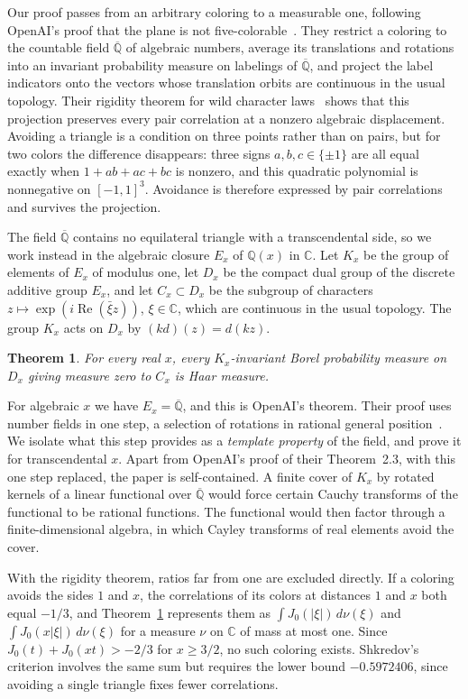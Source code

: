 \documentclass[10pt]{article}
\newtheorem{thm}{Theorem}[section]
\theoremstyle{remark}
\newcommand{\C}{\mathbb C}
\newcommand{\Q}{\mathbb Q}
\newcommand{\Qbar}{\overline{\mathbb Q}}
\DeclareMathOperator{\re}{Re}
\begin{document}
Our proof passes from an arbitrary coloring to a measurable one, following OpenAI's proof that the plane is not five-colorable~\cite{OAI}. They restrict a coloring to the countable field $\Qbar$ of algebraic numbers, average its translations and rotations into an invariant probability measure on labelings of $\Qbar$, and project the label indicators onto the vectors whose translation orbits are continuous in the usual topology. Their rigidity theorem for wild character laws~\cite[Theorem~2.3]{OAI} shows that this projection preserves every pair correlation at a nonzero algebraic displacement. Avoiding a triangle is a condition on three points rather than on pairs, but for two colors the difference disappears: three signs $a,b,c\in\{\pm1\}$ are all equal exactly when $1+ab+ac+bc$ is nonzero, and this quadratic polynomial is nonnegative on $[-1,1]^3$. Avoidance is therefore expressed by pair correlations and survives the projection.

The field $\Qbar$ contains no equilateral triangle with a transcendental side, so we work instead in the algebraic closure $E_x$ of $\Q(x)$ in $\C$. Let $K_x$ be the group of elements of $E_x$ of modulus one, let $D_x$ be the compact dual group of the discrete additive group $E_x$, and let $C_x\subset D_x$ be the subgroup of characters $z\mapsto\exp(i\re(\bar\xi z))$, $\xi\in\C$, which are continuous in the usual topology. The group $K_x$ acts on $D_x$ by $(kd)(z)=d(kz)$.

\begin{thm}\label{thm:rigidityx}
For every real $x$, every $K_x$-invariant Borel probability measure on $D_x$ giving measure zero to $C_x$ is Haar measure.
\end{thm}

For algebraic $x$ we have $E_x=\Qbar$, and this is OpenAI's theorem. Their proof uses number fields in one step, a selection of rotations in rational general position~\cite[Lemma~3.4]{OAI}. We isolate what this step provides as a \emph{template property} of the field, and prove it for transcendental $x$. Apart from OpenAI's proof of their Theorem~2.3, with this one step replaced, the paper is self-contained. A finite cover of $K_x$ by rotated kernels of a linear functional over $\Qbar$ would force certain Cauchy transforms of the functional to be rational functions. The functional would then factor through a finite-dimensional algebra, in which Cayley transforms of real elements avoid the cover.

With the rigidity theorem, ratios far from one are excluded directly. If a coloring avoids the sides $1$ and $x$, the correlations of its colors at distances $1$ and $x$ both equal $-1/3$, and Theorem~\ref{thm:rigidityx} represents them as $\int J_0(|\xi|)\,d\nu(\xi)$ and $\int J_0(x|\xi|)\,d\nu(\xi)$ for a measure $\nu$ on $\C$ of mass at most one. Since $J_0(t)+J_0(xt)>-2/3$ for $x\ge3/2$, no such coloring exists. Shkredov's criterion involves the same sum but requires the lower bound $-0.5972406$, since avoiding a single triangle fixes fewer correlations.
\end{document}
